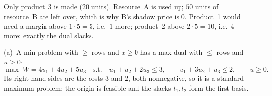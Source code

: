 \begin{solutions}
        Only product~3 is made ($20$ units). Resource~A is used up;
        $50$ units of resource~B are left over, which is why B's shadow
        price is $0$. Product~1 would need a margin above
        $1\cdot5=5$, i.e.\ $1$ more; product~2 above $2\cdot5=10$, i.e.\
        $4$ more: exactly the dual slacks.

  \item (a)~A min problem with $\ge$ rows and $x\ge 0$ has a max dual with
        $\le$ rows and $u\ge 0$:
        \[
          \max\; W=4u_{1}+4u_{2}+5u_{3}
          \quad\text{s.t.}\quad
          u_{1}+u_{2}+2u_{3}\le 3,\qquad u_{1}+3u_{2}+u_{3}\le 2,\qquad
          u\ge 0 .
        \]
        Its right-hand sides are the costs $3$ and $2$, both
        nonnegative, so it is a standard maximum problem: the origin is
        feasible and the slacks $t_{1},t_{2}$ form the first basis.


\end{solutions}

